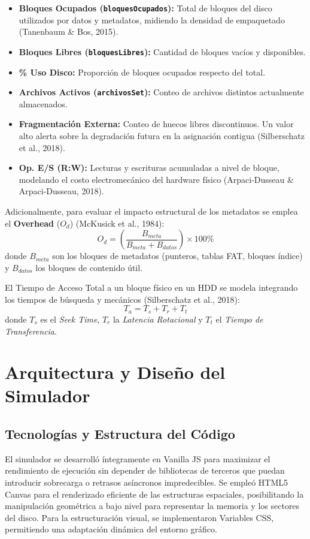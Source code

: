 \documentclass[12pt,a4paper]{article}
\begin{document}
\begin{itemize}
    \item \textbf{Bloques Ocupados (\texttt{bloquesOcupados}):} Total de bloques del disco utilizados por datos y metadatos, midiendo la densidad de empaquetado (Tanenbaum \& Bos, 2015).
    \item \textbf{Bloques Libres (\texttt{bloquesLibres}):} Cantidad de bloques vacíos y disponibles.
    \item \textbf{\% Uso Disco:} Proporción de bloques ocupados respecto del total.
    \item \textbf{Archivos Activos (\texttt{archivosSet}):} Conteo de archivos distintos actualmente almacenados.
    \item \textbf{Fragmentación Externa:} Conteo de huecos libres discontinuos. Un valor alto alerta sobre la degradación futura en la asignación contigua (Silberschatz et al., 2018).
    \item \textbf{Op. E/S (R:W):} Lecturas y escrituras acumuladas a nivel de bloque, modelando el costo electromecánico del hardware físico (Arpaci-Dusseau \& Arpaci-Dusseau, 2018).
\end{itemize}

Adicionalmente, para evaluar el impacto estructural de los metadatos se emplea el \textbf{Overhead} ($O_d$) (McKusick et al., 1984):
\begin{equation}
    O_d = \left( \frac{B_{meta}}{B_{meta} + B_{datos}} \right) \times 100\%
\end{equation}
donde $B_{meta}$ son los bloques de metadatos (punteros, tablas FAT, bloques índice) y $B_{datos}$ los bloques de contenido útil.

El Tiempo de Acceso Total a un bloque físico en un HDD se modela integrando los tiempos de búsqueda y mecánicos (Silberschatz et al., 2018):
\begin{equation}
    T_a = T_s + T_r + T_t
\end{equation}
donde $T_s$ es el \textit{Seek Time}, $T_r$ la \textit{Latencia Rotacional} y $T_t$ el \textit{Tiempo de Transferencia}.

\section{Arquitectura y Diseño del Simulador}

\subsection{Tecnologías y Estructura del Código}
El simulador se desarrolló íntegramente en Vanilla JS para maximizar el rendimiento de ejecución sin depender de bibliotecas de terceros que puedan introducir sobrecarga o retrasos asíncronos impredecibles. Se empleó HTML5 Canvas para el renderizado eficiente de las estructuras espaciales, posibilitando la manipulación geométrica a bajo nivel para representar la memoria y los sectores del disco. Para la estructuración visual, se implementaron Variables CSS, permitiendo una adaptación dinámica del entorno gráfico. 
\end{document}
